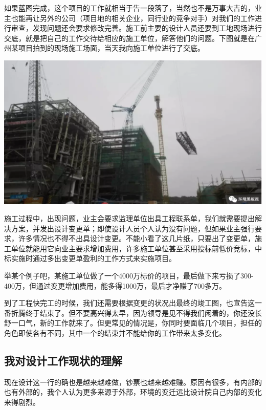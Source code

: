 \documentclass[]{book}
\begin{document}
如果蓝图完成，这个项目的工作就相当于告一段落了，当然也不是万事大吉的，业主也能再让另外的公司（项目地的相关企业，同行业的竞争对手）对我们的工作进行审查，发现问题还会要求修改完善。施工前主要的设计人员还要到工地现场进行交底，就是把自己的工作交待给相应的施工单位，解答他们的问题。下图就是在广州某项目拍到的现场施工场面，当天我向施工单位进行了交底。

\includegraphics[width=8.33in]{images/sisi3}

施工过程中，出现问题，业主会要求监理单位出具工程联系单，我们就需要提出解决方案，并发出设计变更单；即使设计人员个人认为没有问题，但如果业主强行要求，许多情况也不得不出具设计变更。不能小看了这几片纸，只要出了变更单，施工单位就能用它向业主要求增加费用，许多施工单位甚至采用投标前低价竞标，中标实施时通过多出变更单盈利的工作方式来实施项目。

举某个例子吧，某施工单位做了一个4000万标价的项目，最后做下来亏损了300-400万，但通过变更增加费用，能多得1000万，最后才净赚了700多万。

到了工程快完工的时候，我们还需要根据变更的状况出最终的竣工图，也宣告这一番折腾终于结束了。但不要高兴得太早，因为领导是见不得我们闲着的，你还没长舒一口气，新的工作就来了。但更常见的情况是，你同时要面临几个项目，担任的角色即使各有不同，其中一个的结束并不能给你的工作带来太多变化。

\hypertarget{ux6211ux5bf9ux8bbeux8ba1ux5de5ux4f5cux73b0ux72b6ux7684ux7406ux89e3}{%
\subsection{我对设计工作现状的理解}\label{ux6211ux5bf9ux8bbeux8ba1ux5de5ux4f5cux73b0ux72b6ux7684ux7406ux89e3}}

现在设计这一行的确也是越来越难做，钞票也越来越难赚。原因有很多，有内部的也有外部的，我个人认为更多来源于外部，环境的变迁远比设计院自己内部的变化来得剧烈。
\end{document}
